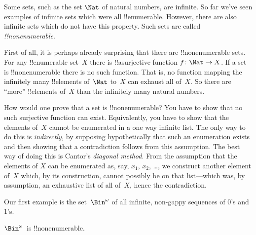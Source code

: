 \documentclass[../../../include/open-logic-section]{subfiles}
\begin{document}


Some sets, such as the set $\Nat$ of natural numbers, are infinite. So
far we've seen examples of infinite sets which were all
!!{enumerable}. However, there are also infinite sets which do not
have this property. Such sets are called \emph{!!{nonenumerable}}.

First of all, it is perhaps already surprising that there are
!!{nonenumerable} sets.  For any !!{enumerable} set~$X$ there is
!!a{surjective} function $f \colon \Nat \to X$.  If a set is
!!{nonenumerable} there is no such function.  That is, no function
mapping the infinitely many !!{element}s of~$\Nat$ to~$X$ can exhaust
all of~$X$.  So there are ``more'' !!{element}s of~$X$ than the
infinitely many natural numbers.

How would one prove that a set is !!{nonenumerable}? You have to show
that no such surjective function can exist. Equivalently, you have to
show that the elements of~$X$ cannot be enumerated in a one way
infinite list.  The only way to do this is \emph{indirectly,} by
supposing hypothetically that such an enumeration exists and then
showing that a contradiction follows from this assumption.  The best
way of doing this is Cantor's \emph{diagonal method}.  From the
assumption that the elements of $X$ can be enumerated as, say, $x_1$,
$x_2$, \dots, we construct another element of~$X$ which, by its
construction, cannot possibly be on that list---which was, by
assumption, an exhaustive list of all of~$X$, hence the contradiction.

Our first example is the set~$\Bin^\omega$ of all infinite, non-gappy
sequences of $0$'s and $1$'s.

\begin{thm}
$\Bin^\omega$~is !!{nonenumerable}.
\end{thm}
\end{document}
